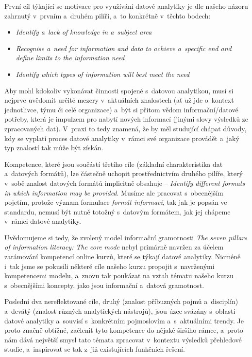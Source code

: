 První cíl týkající se motivace pro využívání datové analytiky je dle našeho názoru zahrnutý v~prvním a~druhém pilíři, a~to konkrétně v~těchto bodech:

\begin{itemize}
\tightlist
\item
  \emph{Identify a~lack of knowledge in a~subject area}
\item
  \emph{Recognise a~need for information and data to achieve a~specific end and define limits to the information need}
\item
  \emph{Identify which types of information will best meet the need}
\end{itemize}

Aby mohl kdokoliv vykonávat činnosti spojené s~datovou analytikou, musí si nejprve uvědomit určité mezery v~aktuálních znalostech (ať už jde o~kontext jednotlivce, týmu či celé organizace) a~být si přitom vědom informační/datové potřeby, která je impulzem pro nabytí nových informací (jinými slovy výsledků ze zpracovaných dat). V~praxi to tedy znamená, že by měl studující chápat důvody, kdy se vyplatí proces datové analytiky v~rámci své organizace provádět a~jaký typ znalostí tak může být získán.

Kompetence, které jsou součástí třetího cíle (základní charakteristika dat a~datových formátů), lze částečně uchopit prostřednictvím druhého pilíře, který v~sobě znalost datových formátů implicitně obsahuje -- \emph{Identify different formats in which information may be provided}. Musíme ale pracovat s~obecnějším pojetím, protože význam formulace \emph{formát informací}, tak jak je popsán ve standardu, nemusí být nutně totožný s~datovým formátem, jak jej chápeme v~rámci datové analytiky.

Uvědomujeme si tedy, že zvolený model informační gramotnosti \emph{The seven pillars of information literacy: The core mode} nebyl primárně navržen za účelem zarámování kompetencí online kurzů, které se týkají datové analytiky. Nicméně i~tak jsme se pokusili některé cíle našeho kurzu propojit s~navrženými kompetencemi modelu, a~znovu tak poukázat na vztah tématu našeho kurzu s~obecnějšími koncepty, jako jsou informační a~datová gramotnost.

Poslední dva nereflektované cíle, druhý (znalost příbuzných pojmů a~disciplín) a~devátý (znalost různých analytických nástrojů), jsou úzce svázány s~oblastí datové analytiky a~souvisí s~konkrétním pojmoslovím a~s~aktuálními trendy. Je proto značně obtížné, začlenit tyto kompetence do nějaké širšího rámce, a~proto nám dává největší smysl tato témata zpracovat v~kontextu výsledků přehledové studie, a~inspirovat se tak z~již existujících funkčních řešení.
